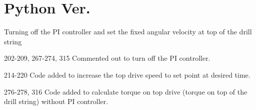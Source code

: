 \section{Python Ver.\ }
Turning off the PI controller and set the fixed angular velocity at top of the drill string

\begin{codemodifications}

\begin{codemodification}{202-209, 267-274, 315}
Commented out to turn off the PI controller. 
\end{codemodification}
\begin{codemodification}{214-220}
Code added to increase the top drive speed to set point at desired time.
\end{codemodification}
\begin{codemodification}{276-278, 316}
Code added to calculate torque on top drive (torque on top of the drill string) without PI controller. 
\end{codemodification}
\end{codemodifications} 